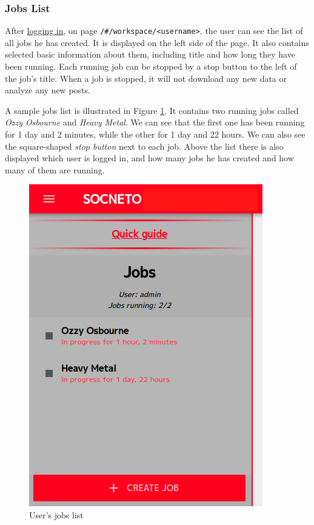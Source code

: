 \documentclass{article}
\begin{document}
\subsubsection{Jobs List}\label{section:jobs-list}
After \href{section:login}{logging in}, on page \texttt{/\#/workspace/<username>}, the user can see the list of all jobs he has created. It is displayed on the left side of the page. It also contains selected basic information about them, including title and how long they have been running. Each running job can be stopped by a stop button to the left of the job's title. When a job is stopped, it will not download any new data or analyze any new posts. 

A sample jobs list is illustrated in Figure \ref{figure:jobs-list}. It contains two running jobs called \textit{Ozzy Osbourne} and \textit{Heavy Metal}. We can see that the first one has been running for 1 day and 2 minutes, while the other for 1 day and 22 hours. We can also see the square-shaped \textit{stop button} next to each job. Above the list there is also displayed which user is logged in, and how many jobs he has created and how many of them are running. 

\begin{figure}[h]
\includegraphics[scale=2]{images/jobs_list.png}
\centering
\caption{User's jobs list}
\label{figure:jobs-list}
\end{figure}
\end{document}
